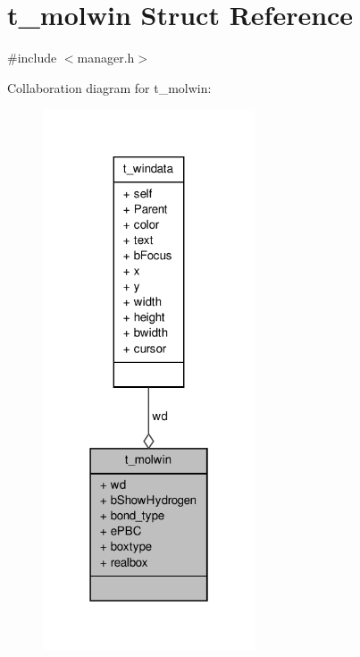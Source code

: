 \hypertarget{structt__molwin}{\section{t\-\_\-molwin \-Struct \-Reference}
\label{structt__molwin}
}


{\ttfamily \#include $<$manager.\-h$>$}



\-Collaboration diagram for t\-\_\-molwin\-:
\nopagebreak
\begin{figure}[H]
\begin{center}
\leavevmode
\includegraphics[width=178pt]{structt__molwin__coll__graph}
\end{center}
\end{figure}
